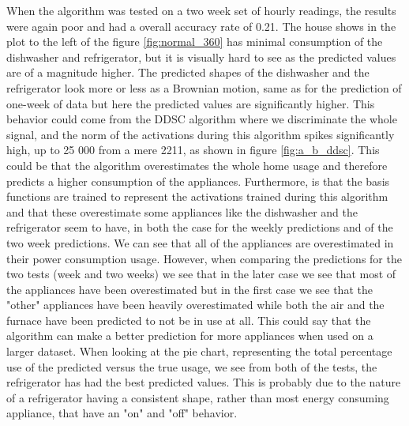 When the algorithm was tested on a two week set of hourly readings, the results were again poor and had a overall accuracy rate of 0.21. The house shows in the plot to the left of the figure \ref{fig:normal_360} has minimal consumption of the dishwasher and refrigerator, but it is visually hard to see as the predicted values are of a magnitude higher. The predicted shapes of the dishwasher and the refrigerator look more or less as a Brownian motion, same as for the prediction of one-week of data but here the predicted values are significantly higher. This behavior could come from the DDSC algorithm where we discriminate the whole signal, and the norm of the activations during this algorithm spikes significantly high, up to 25 000 from a mere 2211, as shown in figure \ref{fig:a_b_ddsc}. This could be that the algorithm overestimates the whole home usage and therefore predicts a higher consumption of the appliances. Furthermore, is that the basis functions are trained to represent the activations trained during this algorithm and that these overestimate some appliances like the dishwasher and the refrigerator seem to have, in both the case for the weekly predictions and of the two week predictions. We can see that all of the appliances are overestimated in their power consumption usage. However, when comparing the predictions for the two tests (week and two weeks) we see that in the later case we see that most of the appliances have been overestimated but in the first case we see that the "other" appliances have been heavily overestimated while both the air and the furnace have been predicted to not be in use at all. This could say that the algorithm can make a better prediction for more appliances when used on a larger dataset. When looking at the pie chart, representing the total percentage use of the predicted versus the true usage, we see from both of the tests, the refrigerator has had the best predicted values. This is probably due to the nature of a refrigerator having a consistent shape, rather than most energy consuming appliance, that have an "on" and "off" behavior.


\newpage
